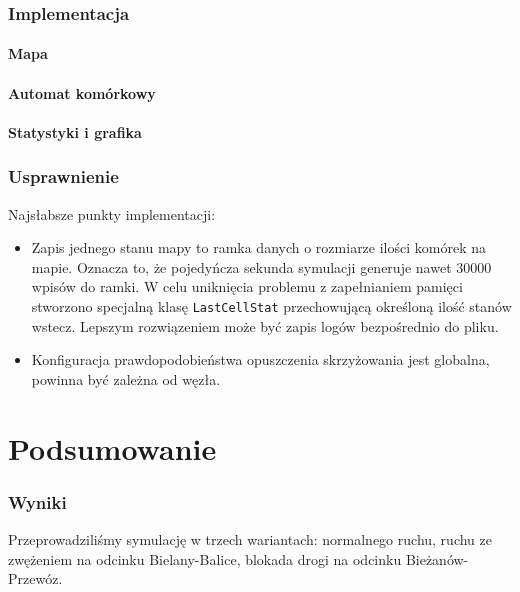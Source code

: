 \documentclass[a4paper,12pt]{article}
\begin{document}
    \section{Implementacja}
    
    \subsection{Mapa}
    \subsection{Automat komórkowy}
    \subsection{Statystyki i grafika}

    \section{Usprawnienie}
    Najsłabsze punkty implementacji:
    
    \begin{itemize}
    	\item Zapis jednego stanu mapy to ramka danych o rozmiarze ilości komórek na mapie. Oznacza to, że pojedyńcza sekunda symulacji generuje nawet 30000 wpisów do ramki. W celu uniknięcia problemu z zapełnianiem pamięci stworzono specjalną klasę \texttt{LastCellStat} przechowującą określoną ilość stanów wstecz.
    	Lepszym rozwiązeniem może być zapis logów bezpośrednio do pliku.
    	
    	\item Konfiguracja prawdopodobieństwa opuszczenia skrzyżowania jest globalna, powinna być zależna od węzła.
    \end{itemize}

    \part{Podsumowanie}

    \section{Wyniki}
    Przeprowadziliśmy symulację w trzech wariantach: normalnego ruchu, ruchu ze zwężeniem na odcinku Bielany-Balice, blokada drogi na odcinku Bieżanów-Przewóz.
    
\end{document}
